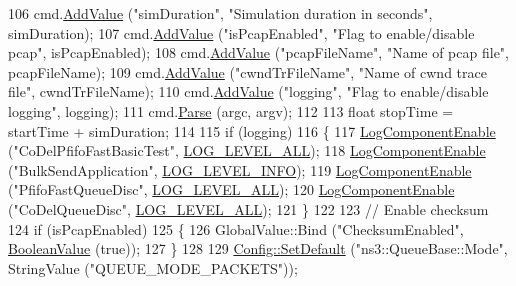 \begin{DoxyCode}
106   cmd.\hyperlink{classns3_1_1CommandLine_addcfb546c7ad4c8bd0965654d55beb8e}{AddValue} (\textcolor{stringliteral}{"simDuration"}, \textcolor{stringliteral}{"Simulation duration in seconds"}, simDuration);
107   cmd.\hyperlink{classns3_1_1CommandLine_addcfb546c7ad4c8bd0965654d55beb8e}{AddValue} (\textcolor{stringliteral}{"isPcapEnabled"}, \textcolor{stringliteral}{"Flag to enable/disable pcap"}, isPcapEnabled);
108   cmd.\hyperlink{classns3_1_1CommandLine_addcfb546c7ad4c8bd0965654d55beb8e}{AddValue} (\textcolor{stringliteral}{"pcapFileName"}, \textcolor{stringliteral}{"Name of pcap file"}, pcapFileName);
109   cmd.\hyperlink{classns3_1_1CommandLine_addcfb546c7ad4c8bd0965654d55beb8e}{AddValue} (\textcolor{stringliteral}{"cwndTrFileName"}, \textcolor{stringliteral}{"Name of cwnd trace file"}, cwndTrFileName);
110   cmd.\hyperlink{classns3_1_1CommandLine_addcfb546c7ad4c8bd0965654d55beb8e}{AddValue} (\textcolor{stringliteral}{"logging"}, \textcolor{stringliteral}{"Flag to enable/disable logging"}, logging);
111   cmd.\hyperlink{classns3_1_1CommandLine_a5c10b85b3207e5ecb48d907966923156}{Parse} (argc, argv);
112 
113   \textcolor{keywordtype}{float} stopTime = startTime + simDuration;
114 
115   \textcolor{keywordflow}{if} (logging)
116     \{
117       \hyperlink{namespacens3_adc4ef4f00bb2f5f4edae67fc3bc27f20}{LogComponentEnable} (\textcolor{stringliteral}{"CoDelPfifoFastBasicTest"}, 
      \hyperlink{namespacens3_aa6464a4d69551a9cc968e17a65f39bdba022b1237a4fd1b08d034471df3c58586}{LOG\_LEVEL\_ALL});
118       \hyperlink{namespacens3_adc4ef4f00bb2f5f4edae67fc3bc27f20}{LogComponentEnable} (\textcolor{stringliteral}{"BulkSendApplication"}, 
      \hyperlink{namespacens3_aa6464a4d69551a9cc968e17a65f39bdbae36aedc880de94fd5a5b53bb9fe65628}{LOG\_LEVEL\_INFO});
119       \hyperlink{namespacens3_adc4ef4f00bb2f5f4edae67fc3bc27f20}{LogComponentEnable} (\textcolor{stringliteral}{"PfifoFastQueueDisc"}, \hyperlink{namespacens3_aa6464a4d69551a9cc968e17a65f39bdba022b1237a4fd1b08d034471df3c58586}{LOG\_LEVEL\_ALL});
120       \hyperlink{namespacens3_adc4ef4f00bb2f5f4edae67fc3bc27f20}{LogComponentEnable} (\textcolor{stringliteral}{"CoDelQueueDisc"}, \hyperlink{namespacens3_aa6464a4d69551a9cc968e17a65f39bdba022b1237a4fd1b08d034471df3c58586}{LOG\_LEVEL\_ALL});
121     \}
122 
123   \textcolor{comment}{// Enable checksum}
124   \textcolor{keywordflow}{if} (isPcapEnabled)
125     \{
126       GlobalValue::Bind (\textcolor{stringliteral}{"ChecksumEnabled"}, \hyperlink{classns3_1_1BooleanValue}{BooleanValue} (\textcolor{keyword}{true}));
127     \}
128 
129   \hyperlink{group__config_ga2e7882df849d8ba4aaad31c934c40c06}{Config::SetDefault} (\textcolor{stringliteral}{"ns3::QueueBase::Mode"}, StringValue (\textcolor{stringliteral}{"QUEUE\_MODE\_PACKETS"}));

\end{DoxyCode}
